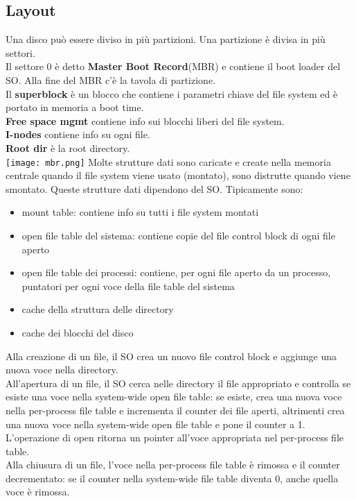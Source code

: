 \documentclass[12pt]{article}
\begin{document}
\subsection{Layout}
Una disco può essere diviso in più partizioni. Una partizione è divisa in più settori.\\
Il settore 0 è detto \textbf{Master Boot Record}(MBR) e contiene il boot loader del SO. Alla fine del MBR c'è la 
tavola di partizione.\\
Il \textbf{superblock} è un blocco che contiene i parametri chiave del file system ed è portato in memoria a boot 
time.\\
\textbf{Free space mgmt} contiene info sui blocchi liberi del file system.\\
\textbf{I-nodes} contiene info su ogni file.\\
\textbf{Root dir} è la root directory.\\
\texttt{[image: mbr.png]}
Molte strutture dati sono caricate e create nella memoria centrale quando il file system viene usato (montato), sono
distrutte quando viene smontato. Queste strutture dati dipendono del SO. Tipicamente sono: 
\begin{itemize}
    \item mount table: contiene info su tutti i file system montati
    \item open file table del sistema: contiene copie del file control block di ogni file aperto
    \item open file table dei processi: contiene, per ogni file aperto da un processo, puntatori per ogni voce
    della file table del sistema
    \item cache della struttura delle directory
    \item cache dei blocchi del disco
\end{itemize}
Alla creazione di un file, il SO crea un nuovo file control block e aggiunge una nuova voce nella directory.\\
All'apertura di un file, il SO cerca nelle directory il file appropriato e controlla se esiste una voce nella 
system-wide open file table: se esiste, crea una nuova voce nella per-process file table e incrementa il counter
dei file aperti, altrimenti crea una nuova voce nella system-wide open file table e pone il counter a 1.
L'operazione di open ritorna un pointer all'voce appropriata nel per-process file table.\\
Alla chiusura di un file, l'voce nella per-process file table è rimossa e il counter decrementato: se il counter 
nella system-wide file table diventa 0, anche quella voce è rimossa.
\end{document}
